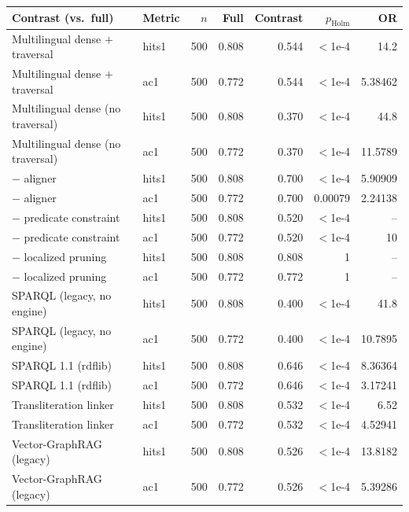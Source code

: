 \begin{tabular}{llrrrrr}
\toprule
Contrast (vs.\ full) & Metric & $n$ & Full & Contrast & $p_{\mathrm{Holm}}$ & OR \\
\midrule
Multilingual dense $+$ traversal & hits1 & 500 & 0.808 & 0.544 & $<$1e-4 & 14.2 \\
Multilingual dense $+$ traversal & ac1 & 500 & 0.772 & 0.544 & $<$1e-4 & 5.38462 \\
Multilingual dense (no traversal) & hits1 & 500 & 0.808 & 0.370 & $<$1e-4 & 44.8 \\
Multilingual dense (no traversal) & ac1 & 500 & 0.772 & 0.370 & $<$1e-4 & 11.5789 \\
$-$ aligner & hits1 & 500 & 0.808 & 0.700 & $<$1e-4 & 5.90909 \\
$-$ aligner & ac1 & 500 & 0.772 & 0.700 & 0.00079 & 2.24138 \\
$-$ predicate constraint & hits1 & 500 & 0.808 & 0.520 & $<$1e-4 & -- \\
$-$ predicate constraint & ac1 & 500 & 0.772 & 0.520 & $<$1e-4 & 10 \\
$-$ localized pruning & hits1 & 500 & 0.808 & 0.808 & 1 & -- \\
$-$ localized pruning & ac1 & 500 & 0.772 & 0.772 & 1 & -- \\
SPARQL (legacy, no engine) & hits1 & 500 & 0.808 & 0.400 & $<$1e-4 & 41.8 \\
SPARQL (legacy, no engine) & ac1 & 500 & 0.772 & 0.400 & $<$1e-4 & 10.7895 \\
SPARQL 1.1 (rdflib) & hits1 & 500 & 0.808 & 0.646 & $<$1e-4 & 8.36364 \\
SPARQL 1.1 (rdflib) & ac1 & 500 & 0.772 & 0.646 & $<$1e-4 & 3.17241 \\
Transliteration linker & hits1 & 500 & 0.808 & 0.532 & $<$1e-4 & 6.52 \\
Transliteration linker & ac1 & 500 & 0.772 & 0.532 & $<$1e-4 & 4.52941 \\
Vector-GraphRAG (legacy) & hits1 & 500 & 0.808 & 0.526 & $<$1e-4 & 13.8182 \\
Vector-GraphRAG (legacy) & ac1 & 500 & 0.772 & 0.526 & $<$1e-4 & 5.39286 \\
\bottomrule
\end{tabular}